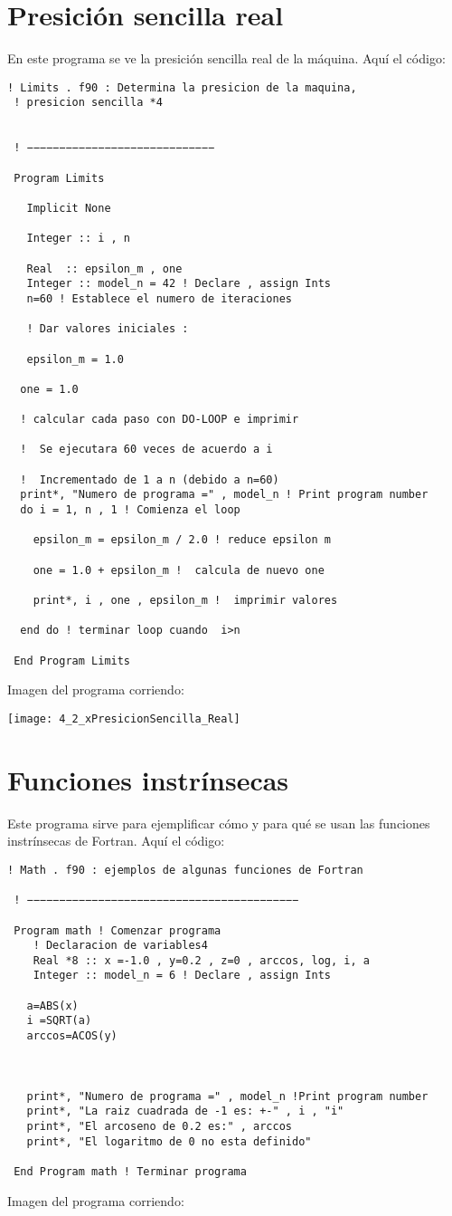 \documentclass[notitlepage,12pt]{article}
\begin{document}
\section{Presici\'on sencilla real}
En este programa se ve la presici\'on sencilla
real de la m\'aquina.
Aqu\'i el c\'odigo:
\begin{verbatim}
! Limits . f90 : Determina la presicion de la maquina, 
 ! presicion sencilla *4


 ! −−−−−−−−−−−−−−−−−−−−−−−−−−−−−

 Program Limits

   Implicit None

   Integer :: i , n

   Real  :: epsilon_m , one
   Integer :: model_n = 42 ! Declare , assign Ints
   n=60 ! Establece el numero de iteraciones

   ! Dar valores iniciales :

   epsilon_m = 1.0

  one = 1.0

  ! calcular cada paso con DO-LOOP e imprimir

  !  Se ejecutara 60 veces de acuerdo a i

  !  Incrementado de 1 a n (debido a n=60)
  print*, "Numero de programa =" , model_n ! Print program number
  do i = 1, n , 1 ! Comienza el loop

    epsilon_m = epsilon_m / 2.0 ! reduce epsilon m

    one = 1.0 + epsilon_m !  calcula de nuevo one

    print*, i , one , epsilon_m !  imprimir valores

  end do ! terminar loop cuando  i>n

 End Program Limits 
\end{verbatim}
Imagen del programa corriendo:

\texttt{[image: 4\_2\_xPresicionSencilla\_Real]}

\section{Funciones instr\'insecas}
Este programa sirve para ejemplificar c\'omo y
para qu\'e se usan las funciones instr\'insecas
de Fortran.
Aqu\'i el c\'odigo:
\begin{verbatim}
! Math . f90 : ejemplos de algunas funciones de Fortran

 ! −−−−−−−−−−−−−−−−−−−−−−−−−−−−−−−−−−−−−−−−−−

 Program math ! Comenzar programa
    ! Declaracion de variables4   
    Real *8 :: x =-1.0 , y=0.2 , z=0 , arccos, log, i, a
    Integer :: model_n = 6 ! Declare , assign Ints
   
   a=ABS(x)
   i =SQRT(a)
   arccos=ACOS(y)
   
   
   
   print*, "Numero de programa =" , model_n !Print program number
   print*, "La raiz cuadrada de -1 es: +-" , i , "i"
   print*, "El arcoseno de 0.2 es:" , arccos
   print*, "El logaritmo de 0 no esta definido"
   
 End Program math ! Terminar programa
\end{verbatim}
Imagen del programa corriendo:
\end{document}
